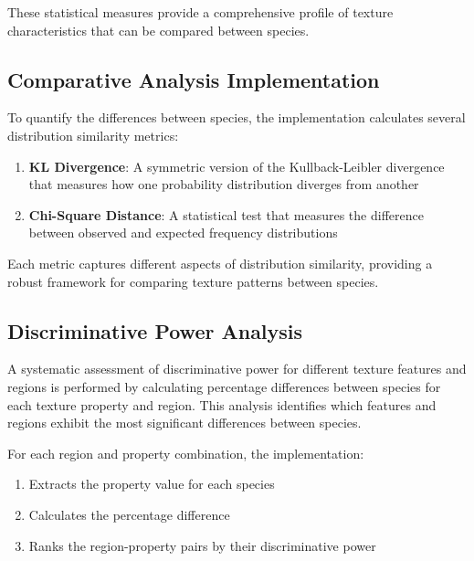 \documentclass[a4paper,12pt]{report}
\begin{document}
These statistical measures provide a comprehensive profile of texture characteristics that can be compared between species.

\subsection{Comparative Analysis Implementation}

To quantify the differences between species, the implementation calculates several distribution similarity metrics:

\begin{enumerate}
    \item \textbf{KL Divergence}: A symmetric version of the Kullback-Leibler divergence that measures how one probability distribution diverges from another


    \item \textbf{Chi-Square Distance}: A statistical test that measures the difference between observed and expected frequency distributions

\end{enumerate}

Each metric captures different aspects of distribution similarity, providing a robust framework for comparing texture patterns between species.

\subsection{Discriminative Power Analysis}

A systematic assessment of discriminative power for different texture features and regions is performed by calculating percentage differences between species for each texture property and region. This analysis identifies which features and regions exhibit the most significant differences between species.

For each region and property combination, the implementation:
\begin{enumerate}
    \item Extracts the property value for each species
    \item Calculates the percentage difference
    \item Ranks the region-property pairs by their discriminative power
\end{enumerate}
\end{document}
